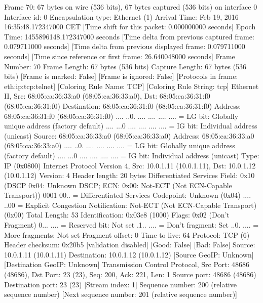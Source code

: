 Frame 70: 67 bytes on wire (536 bits), 67 bytes captured (536 bits) on interface 0
    Interface id: 0
    Encapsulation type: Ethernet (1)
    Arrival Time: Feb 19, 2016 16:35:48.172347000 CET
    [Time shift for this packet: 0.000000000 seconds]
    Epoch Time: 1455896148.172347000 seconds
    [Time delta from previous captured frame: 0.079711000 seconds]
    [Time delta from previous displayed frame: 0.079711000 seconds]
    [Time since reference or first frame: 26.640048000 seconds]
    Frame Number: 70
    Frame Length: 67 bytes (536 bits)
    Capture Length: 67 bytes (536 bits)
    [Frame is marked: False]
    [Frame is ignored: False]
    [Protocols in frame: eth:ip:tcp:telnet]
    [Coloring Rule Name: TCP]
    [Coloring Rule String: tcp]
Ethernet II, Src: 68:05:ca:36:33:a0 (68:05:ca:36:33:a0), Dst: 68:05:ca:36:31:f0 (68:05:ca:36:31:f0)
    Destination: 68:05:ca:36:31:f0 (68:05:ca:36:31:f0)
        Address: 68:05:ca:36:31:f0 (68:05:ca:36:31:f0)
        .... ..0. .... .... .... .... = LG bit: Globally unique address (factory default)
        .... ...0 .... .... .... .... = IG bit: Individual address (unicast)
    Source: 68:05:ca:36:33:a0 (68:05:ca:36:33:a0)
        Address: 68:05:ca:36:33:a0 (68:05:ca:36:33:a0)
        .... ..0. .... .... .... .... = LG bit: Globally unique address (factory default)
        .... ...0 .... .... .... .... = IG bit: Individual address (unicast)
    Type: IP (0x0800)
Internet Protocol Version 4, Src: 10.0.1.11 (10.0.1.11), Dst: 10.0.1.12 (10.0.1.12)
    Version: 4
    Header length: 20 bytes
    Differentiated Services Field: 0x10 (DSCP 0x04: Unknown DSCP; ECN: 0x00: Not-ECT (Not ECN-Capable Transport))
        0001 00.. = Differentiated Services Codepoint: Unknown (0x04)
        .... ..00 = Explicit Congestion Notification: Not-ECT (Not ECN-Capable Transport) (0x00)
    Total Length: 53
    Identification: 0x03e8 (1000)
    Flags: 0x02 (Don't Fragment)
        0... .... = Reserved bit: Not set
        .1.. .... = Don't fragment: Set
        ..0. .... = More fragments: Not set
    Fragment offset: 0
    Time to live: 64
    Protocol: TCP (6)
    Header checksum: 0x20b5 [validation disabled]
        [Good: False]
        [Bad: False]
    Source: 10.0.1.11 (10.0.1.11)
    Destination: 10.0.1.12 (10.0.1.12)
    [Source GeoIP: Unknown]
    [Destination GeoIP: Unknown]
Transmission Control Protocol, Src Port: 48686 (48686), Dst Port: 23 (23), Seq: 200, Ack: 221, Len: 1
    Source port: 48686 (48686)
    Destination port: 23 (23)
    [Stream index: 1]
    Sequence number: 200    (relative sequence number)
    [Next sequence number: 201    (relative sequence number)]

